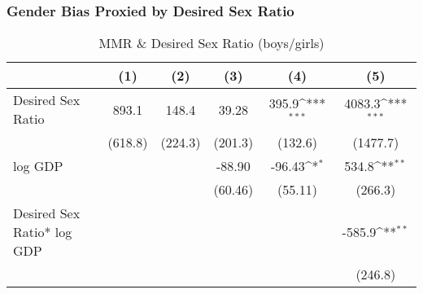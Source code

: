 \documentclass[10pt,letterpaper,subeqn]{beamer}
\begin{document}
\begin{frame}[label=DSRanalysis]
\frametitle{Gender Bias Proxied by  Desired Sex Ratio} 
%
\begin{table}[htbp]\centering
\def\sym#1{\ifmmode^{#1}\else\(^{#1}\)\fi}
\caption{MMR \& Desired Sex Ratio (boys/girls)  \label{MMRdsrNew}}
\scriptsize
\begin{tabular}{l*{5}{c}}
\hline\hline
            &\multicolumn{1}{c}{(1)}&\multicolumn{1}{c}{(2)}&\multicolumn{1}{c}{(3)}&\multicolumn{1}{c}{(4)}&\multicolumn{1}{c}{(5)}\\
\hline
Desired Sex Ratio  &       893.1         &       148.4         &       39.28         &       395.9\sym{***}&            4083.3\sym{***}\\
            &     (618.8)         &     (224.3)         &     (201.3)         &     (132.6)         &        (1477.7)         \\

log GDP        &                     &                     &      -88.90         &      -96.43\sym{*}  &              534.8\sym{**} \\
            &                     &                     &     (60.46)         &     (55.11)         &          (266.3)         \\


Desired Sex Ratio* log GDP    &                     &                     &                     &                     &          -585.9\sym{**} \\
            &                     &                     &                     &                     &         (246.8)         \\


\end{tabular}
\end{table}
\end{frame}
\end{document}
